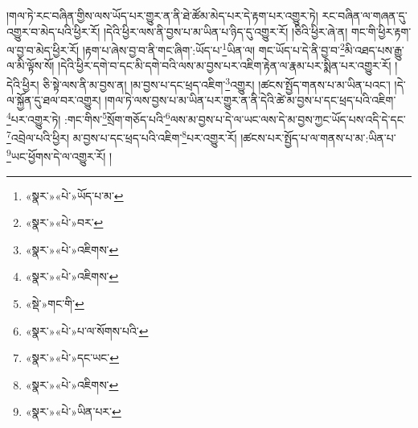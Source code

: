 །གལ་ཏེ་རང་བཞིན་གྱིས་ལས་ཡོད་པར་གྱུར་ན་ནི་ཐེ་ཚོམ་མེད་པར་དེ་རྟག་པར་འགྱུར་ཏེ། རང་བཞིན་ལ་གཞན་དུ་འགྱུར་བ་མེད་པའི་ཕྱིར་རོ། །དེའི་ཕྱིར་ལས་ནི་བྱས་པ་མ་ཡིན་པ་ཉིད་དུ་འགྱུར་རོ། །ཅིའི་ཕྱིར་ཞེ་ན། གང་གི་ཕྱིར་རྟག་ལ་བྱ་བ་མེད་ཕྱིར་རོ། །རྟག་པ་ཞེས་བྱ་བ་ནི་གང་ཞིག་:ཡོད་པ་\footnote{«སྣར་»«པེ་»ཡོད་པ་མ་}ཡིན་ལ། གང་ཡོད་པ་དེ་ནི་བྱ་བ་\footnote{«སྣར་»«པེ་»བར་}མི་འཐད་པས་རྒྱུ་ལ་མི་ལྟོས་སོ། །དེའི་ཕྱིར་དགེ་བ་དང་མི་དགེ་བའི་ལས་མ་བྱས་པར་འཇིག་རྟེན་ལ་རྣམ་པར་སྨིན་པར་འགྱུར་རོ། །དེའི་ཕྱིར། ཅི་སྟེ་ལས་ནི་མ་བྱས་ན། །མ་བྱས་པ་དང་ཕྲད་འཇིག་\footnote{«སྣར་»«པེ་»འཇིགས་}འགྱུར། །ཚངས་སྤྱོད་གནས་པ་མ་ཡིན་པའང་། །དེ་ལ་སྐྱོན་དུ་ཐལ་བར་འགྱུར། །གལ་ཏེ་ལས་བྱས་པ་མ་ཡིན་པར་གྱུར་ན་ནི་དེའི་ཚེ་མ་བྱས་པ་དང་ཕྲད་པའི་འཇིག་\footnote{«སྣར་»«པེ་»འཇིགས་}པར་འགྱུར་ཏེ། :གང་གིས་\footnote{«སྡེ་»གང་གི་}སྲོག་གཅོད་པའི་\footnote{«སྣར་»«པེ་»པ་ལ་སོགས་པའི་}ལས་མ་བྱས་པ་དེ་ལ་ཡང་ལས་དེ་མ་བྱས་ཀྱང་ཡོད་པས་འདི་དེ་དང་\footnote{«སྣར་»«པེ་»དང་ཡང་}འབྲེལ་པའི་ཕྱིར། མ་བྱས་པ་དང་ཕྲད་པའི་འཇིག་\footnote{«སྣར་»«པེ་»འཇིགས་}པར་འགྱུར་རོ། །ཚངས་པར་སྤྱོད་པ་ལ་གནས་པ་མ་:ཡིན་པ་\footnote{«སྣར་»«པེ་»ཡིན་པར་}ཡང་ཕྱོགས་དེ་ལ་འགྱུར་རོ། །
